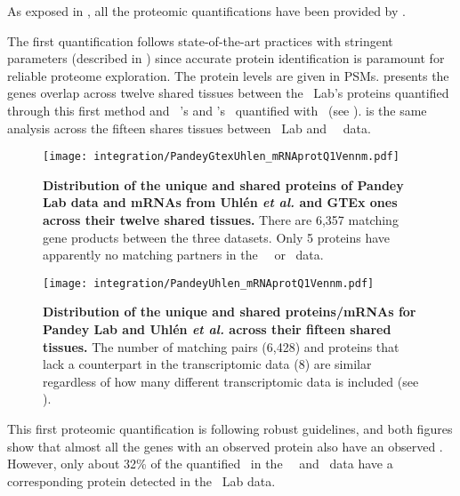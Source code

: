 As exposed in ,
all the proteomic quantifications have been provided by \james.\mybr\

The first quantification follows state-of-the-art practices
with stringent parameters (described in )
since accurate protein identification is paramount
for reliable proteome exploration.
The protein levels are given in \glspl{PSM}.
 presents
the genes overlap across twelve shared tissues
between the \pandey\ Lab's proteins quantified through this first method
and \uhlen\ \etal{}'s and \gtex{}'s \mRNAs\ quantified
with \htseq\ (see ).
 is the same analysis across the fifteen shares tissues
between \pandey\ Lab and \uhlen\ \etal\ data.\mybr\
\vspace{5mm}

\begin{figure}[!htb]
    \texttt{[image: integration/PandeyGtexUhlen\_mRNAprotQ1Vennm.pdf]}\centering
    \caption[Distribution of the unique and shared proteins/mRNAs for the three datasets
    across twelve tissues]{%
    \label{fig:PGU_vennQ1}\textbf{Distribution of the unique and shared proteins
    of Pandey Lab data and mRNAs from Uhlén \textit{et al.} and GTEx ones across
    their twelve shared tissues.}
    There are 6,357 matching gene products between the three datasets.
    Only 5 proteins have apparently no matching partners
    in the \uhlen\ \etal\ or \gtex\ data.}
\end{figure}


\begin{figure}[!htb]
    \texttt{[image: integration/PandeyUhlen\_mRNAprotQ1Vennm.pdf]}\centering
    \caption[Distribution of the unique and shared proteins/mRNAs for Pandey Lab
    and Uhlén \textit{et al.} across fifteen tissues.]{%
    \label{fig:PU_vennQ1}\textbf{Distribution of the unique and shared proteins/mRNAs
    for Pandey Lab and Uhlén \textit{et al.} across their fifteen shared tissues.}
    The number of matching pairs (6,428) and proteins that lack a counterpart in
    the transcriptomic data (8) are similar regardless of how many different
    transcriptomic data is included (see \Cref{fig:PGU_vennQ1}).}
\end{figure}

This first proteomic quantification is following robust guidelines,
and both figures show that
almost all the genes with an observed protein
also have an observed \mRNA{}.
However, only about 32\% of the quantified \mRNAs\
in the \uhlen\ \etal\ and \gtex\ data
have a corresponding protein detected in the \pandey\ Lab data.\mybr\

